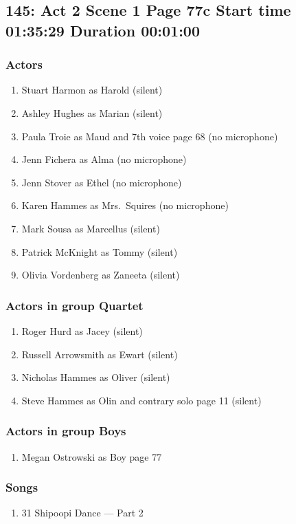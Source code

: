 \subsection{145: Act 2 Scene 1 Page 77c Start time 01:35:29 Duration 00:01:00}

\subsubsection{Actors}
\begin{enumerate}
\item Stuart Harmon as Harold (silent)
\item Ashley Hughes as Marian (silent)
\item Paula Troie as Maud and 7th voice page 68 (no microphone)
\item Jenn Fichera as Alma (no microphone)
\item Jenn Stover as Ethel (no microphone)
\item Karen Hammes as Mrs.~Squires (no microphone)
\item Mark Sousa as Marcellus (silent)
\item Patrick McKnight as Tommy (silent)
\item Olivia Vordenberg as Zaneeta (silent)
\end{enumerate}
\subsubsection{Actors in group Quartet}
\begin{enumerate}
\item Roger Hurd as Jacey (silent)
\item Russell Arrowsmith as Ewart (silent)
\item Nicholas Hammes as Oliver (silent)
\item Steve Hammes as Olin and contrary solo page 11 (silent)
\end{enumerate}
\subsubsection{Actors in group Boys}
\begin{enumerate}
\item Megan Ostrowski as Boy page 77
\end{enumerate}

\subsubsection{Songs}
\begin{enumerate}
\item 31 Shipoopi Dance --- Part 2
\end{enumerate}
